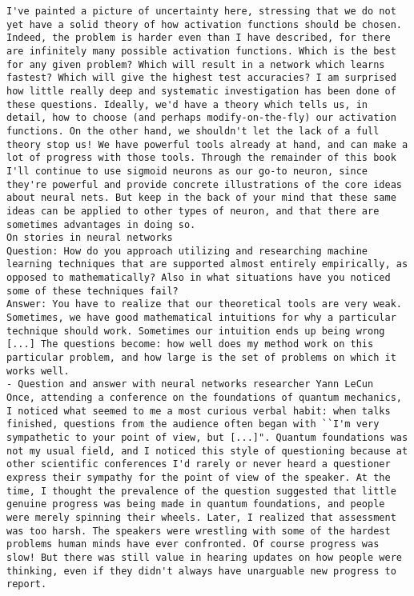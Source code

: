 \begin{lstlisting}
I've painted a picture of uncertainty here, stressing that we do not yet have a solid theory of how activation functions should be chosen. Indeed, the problem is harder even than I have described, for there are infinitely many possible activation functions. Which is the best for any given problem? Which will result in a network which learns fastest? Which will give the highest test accuracies? I am surprised how little really deep and systematic investigation has been done of these questions. Ideally, we'd have a theory which tells us, in detail, how to choose (and perhaps modify-on-the-fly) our activation functions. On the other hand, we shouldn't let the lack of a full theory stop us! We have powerful tools already at hand, and can make a lot of progress with those tools. Through the remainder of this book I'll continue to use sigmoid neurons as our go-to neuron, since they're powerful and provide concrete illustrations of the core ideas about neural nets. But keep in the back of your mind that these same ideas can be applied to other types of neuron, and that there are sometimes advantages in doing so.
On stories in neural networks
Question: How do you approach utilizing and researching machine learning techniques that are supported almost entirely empirically, as opposed to mathematically? Also in what situations have you noticed some of these techniques fail?
Answer: You have to realize that our theoretical tools are very weak. Sometimes, we have good mathematical intuitions for why a particular technique should work. Sometimes our intuition ends up being wrong [...] The questions become: how well does my method work on this particular problem, and how large is the set of problems on which it works well.
- Question and answer with neural networks researcher Yann LeCun
Once, attending a conference on the foundations of quantum mechanics, I noticed what seemed to me a most curious verbal habit: when talks finished, questions from the audience often began with ``I'm very sympathetic to your point of view, but [...]". Quantum foundations was not my usual field, and I noticed this style of questioning because at other scientific conferences I'd rarely or never heard a questioner express their sympathy for the point of view of the speaker. At the time, I thought the prevalence of the question suggested that little genuine progress was being made in quantum foundations, and people were merely spinning their wheels. Later, I realized that assessment was too harsh. The speakers were wrestling with some of the hardest problems human minds have ever confronted. Of course progress was slow! But there was still value in hearing updates on how people were thinking, even if they didn't always have unarguable new progress to report.

\end{lstlisting}
